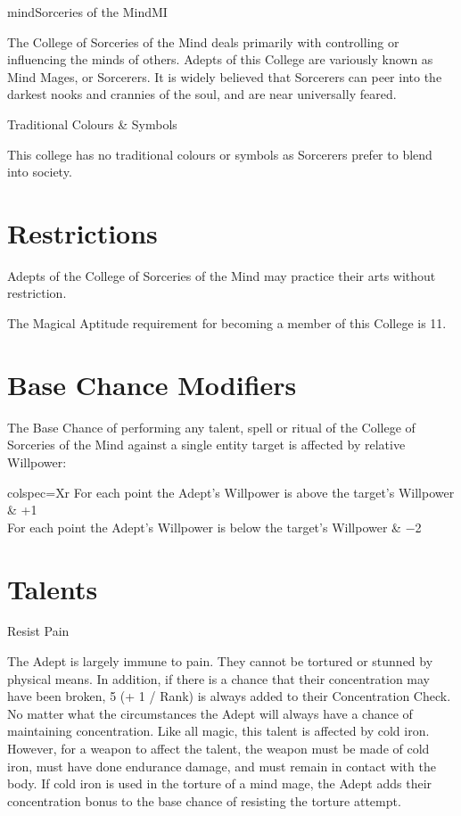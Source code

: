 \begin{College}[1.6]{mind}{Sorceries of the Mind}{MI}

The College of Sorceries of the Mind deals primarily with controlling
or influencing the minds of others. Adepts of this College are
variously known as Mind Mages, or Sorcerers. It is widely believed
that Sorcerers can peer into the darkest nooks and crannies of the
soul, and are near universally feared.

Traditional Colours \& Symbols  

This college has no traditional colours or symbols as Sorcerers prefer
to blend into society.

\section{Restrictions}

Adepts of the College of Sorceries of the Mind may practice their arts
without restriction.

The Magical Aptitude requirement for becoming a member of this College
is 11.

\section{Base Chance Modifiers}

The Base Chance of performing any talent, spell or ritual of the
College of Sorceries of the Mind against a single entity target is
affected by relative Willpower:

\begin{dqtblr}{colspec={Xr}}
For each point the Adept’s Willpower is above the target’s Willpower & +1 \\
For each point the Adept’s Willpower is below the target’s Willpower & −2 \\
\end{dqtblr}

\section{Talents}

\begin{talent}[T-1]{Resist Pain}

\begin{effects}
The Adept is largely immune to pain. They cannot be tortured or
stunned by physical means.  In addition, if there is a chance that
their concentration may have been broken, 5 (+ 1 / Rank) is always
added to their Concentration Check.  No matter what the circumstances
the Adept will always have a chance of maintaining concentration.
Like all magic, this talent is affected by cold iron.  However, for a
weapon to affect the talent, the weapon must be made of cold iron,
must have done endurance damage, and must remain in contact with the
body. If cold iron is used in the torture of a mind mage, the Adept
adds their concentration bonus to the base chance of resisting the
torture attempt.
\end{effects}
\end{talent}


\end{College}
